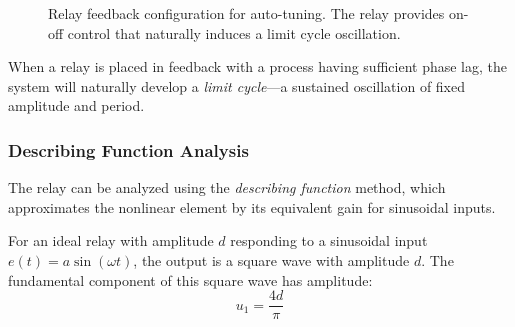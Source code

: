 \begin{figure}[htbp]
\centering
{}
\caption{Relay feedback configuration for auto-tuning. The relay provides on-off control that naturally induces a limit cycle oscillation.}
\label{fig:relay_feedback}
\end{figure}

When a relay is placed in feedback with a process having sufficient phase lag, the system will naturally develop a \textit{limit cycle}---a sustained oscillation of fixed amplitude and period.

\subsubsection{Describing Function Analysis}

The relay can be analyzed using the \textit{describing function} method, which approximates the nonlinear element by its equivalent gain for sinusoidal inputs.

For an ideal relay with amplitude $d$ responding to a sinusoidal input $e(t) = a\sin(\omega t)$, the output is a square wave with amplitude $d$. The fundamental component of this square wave has amplitude:
\begin{equation}
    u_1 = \frac{4d}{\pi}
\end{equation}

